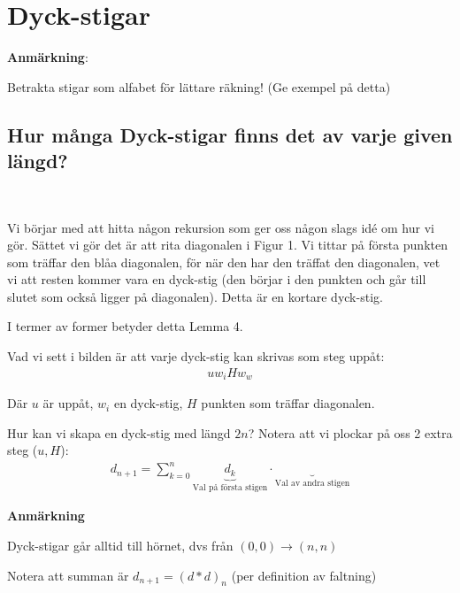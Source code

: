 \section{Dyck-stigar}
\par\bigskip
\noindent\textbf{Anmärkning}:\par
\noindent Betrakta stigar som alfabet för lättare räkning! (Ge exempel på detta)
\par\bigskip
\subsection{Hur många Dyck-stigar finns det av varje given längd?}\hfill\\
\par\bigskip
\noindent Vi börjar med att hitta någon rekursion som ger oss någon slags id\'e om hur vi gör. Sättet vi gör det är att rita diagonalen i Figur 1. Vi tittar på första punkten som träffar den blåa diagonalen, för när den har den träffat den diagonalen, vet vi att resten kommer vara en dyck-stig (den börjar i den punkten och går till slutet som också ligger på diagonalen). Detta är en kortare dyck-stig.
\par\bigskip
\noindent I termer av former betyder detta Lemma 4.\par
\noindent Vad vi sett i bilden är att varje dyck-stig kan skrivas som steg uppåt:
\begin{equation*}
  \begin{gathered}
    uw_iHw_w
  \end{gathered}
\end{equation*}\par
\noindent Där $u$ är uppåt, $w_i$ en dyck-stig, $H$ punkten som träffar diagonalen.
\par\bigskip
\noindent Hur kan vi skapa en dyck-stig med längd $2n$? Notera att vi plockar på oss 2 extra steg ($u, H$):
\begin{equation*}
  \begin{gathered}
  d_{n+1} = \sum_{k=0}^{n}\underbrace{d_k}_{\text{Val på första stigen}}\cdot \underbrace{}_{\text{Val av andra stigen}}
  \end{gathered}
\end{equation*}
\par\bigskip
\noindent\textbf{Anmärkning}\par
\noindent Dyck-stigar går alltid till hörnet, dvs från $(0,0)\to(n,n)$
\par\bigskip
\noindent Notera att summan är $d_{n+1} = (d*d)_n$ (per definition av faltning)
